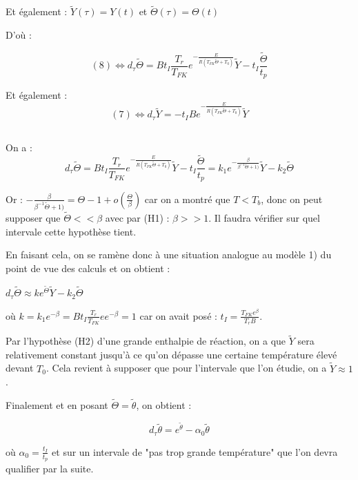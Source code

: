\documentclass[10pt,a4paper]{report}
\begin{document}
	Et également : $ \tilde{Y}(\tau) = Y(t)$ et $ \tilde{\Theta}(\tau) = \Theta(t)$
	
	D'où : 
	
	$$(8) \Leftrightarrow  d_\tau\tilde{\Theta} = Bt_I\frac{T_r}{T_{FK}}e^{-\frac{E}{R(T_{FK}\tilde{\Theta}+T_0)}}\tilde{Y} - t_I \frac{\tilde{\Theta}}{t_p} $$
	
	Et également : $$(7) \Leftrightarrow d_\tau\tilde{Y} = -t_IBe^{-\frac{E}{R(T_{FK}\tilde{\Theta}+T_0)}}\tilde{Y}$$
	
	\subsection{} %
		
	\subsubsection{}%
	On a : 
	$$ d_\tau\tilde{\Theta} = Bt_I\frac{T_r}{T_{FK}}e^{-\frac{E}{R(T_{FK}\tilde{\Theta}+T_0)}}\tilde{Y} - t_I \frac{\tilde{\Theta}}{t_p} = k_1 e^{-\frac{\beta}{\beta^{-1}\tilde{\Theta}+1)}}\tilde{Y} - k_2 \tilde{\Theta}$$
	
	Or :
	$ -\frac{\beta}{\beta^{-1}\tilde{\Theta}+1)} = \Theta - 1 + o(\frac{\Theta}{\beta})$ car on a montré que $T<T_b$, donc on peut supposer que $\tilde{\Theta} << \beta$ avec par (H1) : $\beta >> 1$. Il faudra vérifier sur quel intervale cette hypothèse tient.
	
	En faisant cela, on se ramène donc à une situation analogue au modèle 1) du point de vue des calculs et on obtient :
	
	$ d_\tau\tilde{\Theta} \approx k e^{\tilde{\Theta}}\tilde{Y} - k_2 \tilde{\Theta} $ 
	
	où $ k = k_1 e^{-\beta} = Bt_I \frac{T_r}{T_{FK}} e e^{-\beta} = 1$ car on avait posé : $t_I = \frac{T_{FK}e^{\beta}}{T_rB}$.
	
	Par l'hypothèse (H2) d'une grande enthalpie de réaction, on a que $\tilde{Y}$ sera relativement constant jusqu'à ce qu'on dépasse une certaine température élevé devant $T_0$. Cela revient à supposer que pour l'intervale que l'on étudie, on a $\tilde{Y} \approx 1$.
	
	Finalement et en posant $\tilde{\Theta} = \tilde{\theta}$, on obtient :
	
	$$ d_\tau\tilde{\theta} = e^{\tilde{\theta}} - \alpha_0 \tilde{\theta} $$ 
	
	où $\alpha_0 = \frac{t_I}{t_p}$ et sur un intervale de "pas trop grande température" que l'on devra qualifier par la suite.
	
\end{document}

